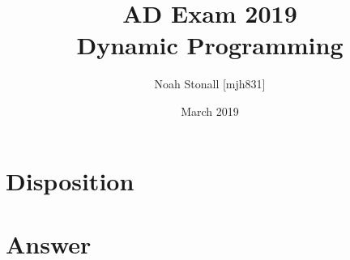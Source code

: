 \documentclass{article}
\title{AD Exam 2019 \\ Dynamic Programming}
\author{Noah Stonall [mjh831]}
\date{March 2019}
\begin{document}
\maketitle

\section*{Disposition}


\section*{Answer}

\end{document}
